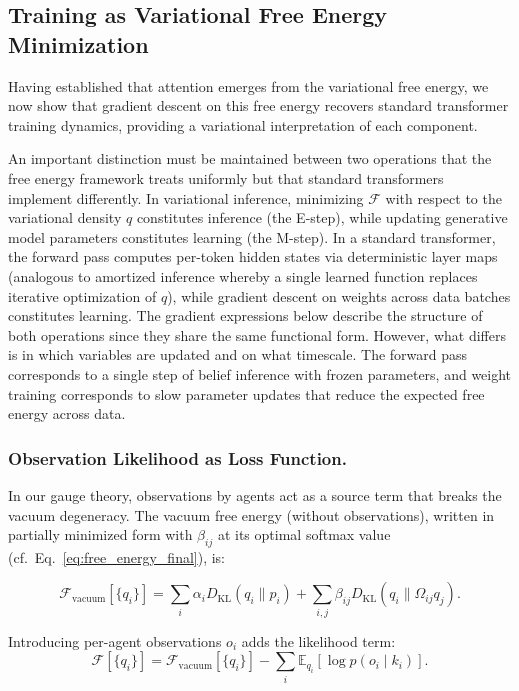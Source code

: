 \documentclass[twoside,11pt]{article}
\begin{document}
\subsection{Training as Variational Free Energy Minimization}

Having established that attention emerges from the variational free energy, we now show that gradient descent on this free energy recovers standard transformer training dynamics, providing a variational interpretation of each component.

An important distinction must be maintained between two operations that the free energy framework treats uniformly but that standard transformers implement differently. In variational inference, minimizing $\mathcal{F}$ with respect to the variational density $q$ constitutes inference (the E-step), while updating generative model parameters constitutes learning (the M-step). In a standard transformer, the forward pass computes per-token hidden states via deterministic layer maps (analogous to amortized inference whereby a single learned function replaces iterative optimization of $q$), while gradient descent on weights across data batches constitutes learning. The gradient expressions below describe the structure of both operations since they share the same functional form. However, what differs is in which variables are updated and on what timescale. The forward pass corresponds to a single step of belief inference with frozen parameters, and weight training corresponds to slow parameter updates that reduce the expected free energy across data.

\subsubsection{Observation Likelihood as Loss Function.}

In our gauge theory, observations by agents act as a source term that breaks the vacuum degeneracy. The vacuum free energy (without observations), written in partially minimized form with $\beta_{ij}$ at its optimal softmax value (cf.\ Eq.~\ref{eq:free_energy_final}), is:

\begin{equation}
\mathcal{F}_{\text{vacuum}}[\{q_i\}] = \sum_i \alpha_iD_{\mathrm{KL}}(q_i \| p_i) + \sum_{i,j} \beta_{ij} D_{\mathrm{KL}}(q_i \| \Omega_{ij} q_j).
\end{equation}

Introducing per-agent observations $o_i$ adds the likelihood term:
\begin{equation}
\mathcal{F}[\{q_i\}] = \mathcal{F}_{\text{vacuum}}[\{q_i\}] - \sum_i \mathbb{E}_{q_i}[\log p(o_i \mid k_i)].
\end{equation}
\end{document}
